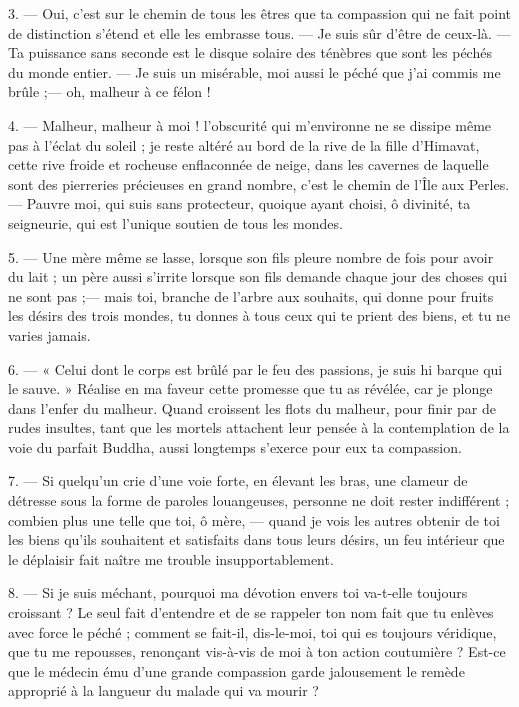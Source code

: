 \documentclass[a4paper, 11pt, oneside, french, landscape, twocolumn]{article}
\begin{document}
3. --- Oui, c'est sur le chemin de tous les êtres que ta compassion qui ne fait point de distinction s'étend et elle les embrasse tous. --- Je suis sûr d'être de ceux-là. --- Ta puissance sans seconde est le disque solaire des ténèbres que sont les péchés du monde entier. --- Je suis un misérable, moi aussi le péché que j'ai commis me brûle ;--- oh, malheur à ce félon !

4. --- Malheur, malheur à moi ! l'obscurité qui m'environne ne se dissipe même pas à l'éclat du soleil ; je reste altéré au bord de la rive de la fille d'Himavat, cette rive froide et rocheuse enflaconnée de neige, dans les cavernes de laquelle sont des pierreries précieuses en grand nombre, c'est le chemin de l'Île aux Perles. --- Pauvre moi, qui suis sans protecteur, quoique ayant choisi, ô divinité, ta seigneurie, qui est l'unique soutien de tous les mondes.

5. --- Une mère même se lasse, lorsque son fils pleure nombre de fois pour avoir du lait ; un père aussi s'irrite lorsque son fils demande chaque jour des choses qui ne sont pas ;--- mais toi, branche de l'arbre aux souhaits, qui donne pour fruits les désirs des trois mondes, tu donnes à tous ceux qui te prient des biens, et tu ne varies jamais.

6. --- « Celui dont le corps est brûlé par le feu des passions, je suis hi barque qui le sauve. » Réalise en ma faveur cette promesse que tu as révélée, car je plonge dans l'enfer du malheur. Quand croissent les flots du malheur, pour finir par de rudes insultes, tant que les mortels attachent leur pensée à la contemplation de la voie du parfait Buddha, aussi longtemps s'exerce pour eux ta compassion.

7. --- Si quelqu'un crie d'une voie forte, en élevant les bras, une clameur de détresse sous la forme de paroles louangeuses, personne ne doit rester indifférent ; combien plus une telle que toi, ô mère, --- quand je vois les autres obtenir de toi les biens qu'ils souhaitent et satisfaits dans tous leurs désirs, un feu intérieur que le déplaisir fait naître me trouble insupportablement.

8. --- Si je suis méchant, pourquoi ma dévotion envers toi va-t-elle toujours croissant ? Le seul fait d'entendre et de se rappeler ton nom fait que tu enlèves avec force le péché ; comment se fait-il, dis-le-moi, toi qui es toujours véridique, que tu me repousses, renonçant vis-à-vis de moi à ton action coutumière ? Est-ce que le médecin ému d'une grande compassion garde jalousement le remède approprié à la langueur du malade qui va mourir ?
\end{document}
